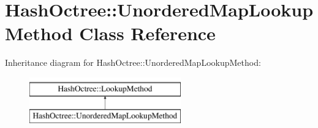 \hypertarget{class_hash_octree_1_1_unordered_map_lookup_method}{}\section{Hash\+Octree\+::Unordered\+Map\+Lookup\+Method Class Reference}
\label{class_hash_octree_1_1_unordered_map_lookup_method}
Inheritance diagram for Hash\+Octree\+::Unordered\+Map\+Lookup\+Method\+:\begin{figure}[H]
\begin{center}
\leavevmode
\includegraphics[height=2.000000cm]{class_hash_octree_1_1_unordered_map_lookup_method}
\end{center}
\end{figure}

